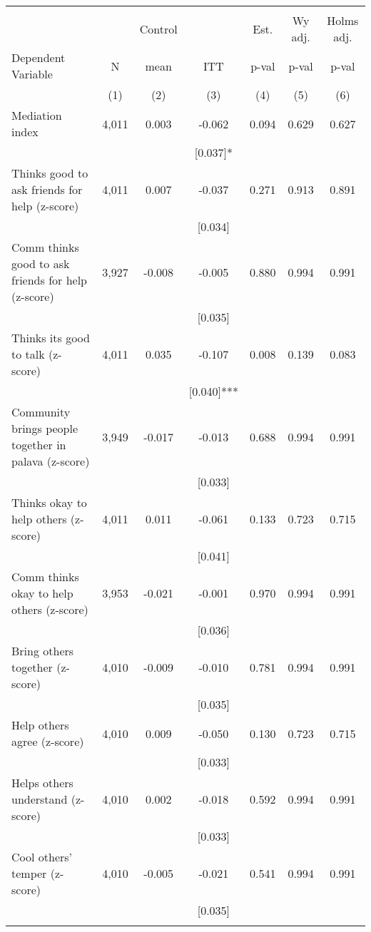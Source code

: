 \begin{tabular}{lcccccc}
\hline \noalign{\smallskip} &  &  &  &  &  & \\
 &  & Control &  & Est. & Wy adj. & Holms adj.\\
Dependent Variable & N & mean & ITT & p-val & p-val & p-val\\
 & (1) & (2) & (3) & (4) & (5) & (6)\\
\noalign{\smallskip}\hline \noalign{\smallskip}\quad Mediation index & 4,011 & 0.003 & -0.062 & 0.094 & 0.629 & 0.627\\
 &  &  & [0.037]* &  &  & \\
\quad Thinks good to ask friends for help (z-score) & 4,011 & 0.007 & -0.037 & 0.271 & 0.913 & 0.891\\
 &  &  & [0.034] &  &  & \\
\quad Comm thinks good to ask friends for help (z-score) & 3,927 & -0.008 & -0.005 & 0.880 & 0.994 & 0.991\\
 &  &  & [0.035] &  &  & \\
\quad Thinks its good to talk (z-score) & 4,011 & 0.035 & -0.107 & 0.008 & 0.139 & 0.083\\
 &  &  & [0.040]*** &  &  & \\
\quad Community brings people together in palava (z-score) & 3,949 & -0.017 & -0.013 & 0.688 & 0.994 & 0.991\\
 &  &  & [0.033] &  &  & \\
\quad Thinks okay to help others (z-score) & 4,011 & 0.011 & -0.061 & 0.133 & 0.723 & 0.715\\
 &  &  & [0.041] &  &  & \\
\quad Comm thinks okay to help others (z-score) & 3,953 & -0.021 & -0.001 & 0.970 & 0.994 & 0.991\\
 &  &  & [0.036] &  &  & \\
\quad Bring others together (z-score) & 4,010 & -0.009 & -0.010 & 0.781 & 0.994 & 0.991\\
 &  &  & [0.035] &  &  & \\
\quad Help others agree (z-score) & 4,010 & 0.009 & -0.050 & 0.130 & 0.723 & 0.715\\
 &  &  & [0.033] &  &  & \\
\quad Helps others understand (z-score) & 4,010 & 0.002 & -0.018 & 0.592 & 0.994 & 0.991\\
 &  &  & [0.033] &  &  & \\
\quad Cool others' temper (z-score) & 4,010 & -0.005 & -0.021 & 0.541 & 0.994 & 0.991\\
 &  &  & [0.035] &  &  & \\
\noalign{\smallskip}\hline\end{tabular}
